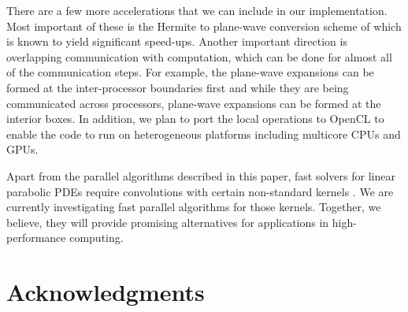 \documentclass[conference]{IEEEtran}
\begin{document}
There are a few more accelerations that we can include in our implementation. Most important of these is the Hermite to 
plane-wave conversion scheme of \cite{fggt} which is known to yield significant speed-ups. Another important direction
 is overlapping communication with computation, which can be done for almost all of the communication steps. For example, 
 the plane-wave expansions can be formed at the inter-processor boundaries first and while they are being communicated 
 across processors, plane-wave expansions can be formed at the interior boxes. In addition, we plan to port
 the local operations to OpenCL \cite{opencl} to enable the code to run on heterogeneous platforms including multicore CPUs and GPUs.

Apart from the parallel algorithms described in this paper, fast solvers for linear parabolic PDEs 
require convolutions with certain non-standard kernels \cite{li09, skv09}. We are currently investigating fast 
parallel algorithms for those kernels. Together, we believe, they will provide promising alternatives 
for applications in high-performance computing. 

\section*{Acknowledgments}




\end{document}
